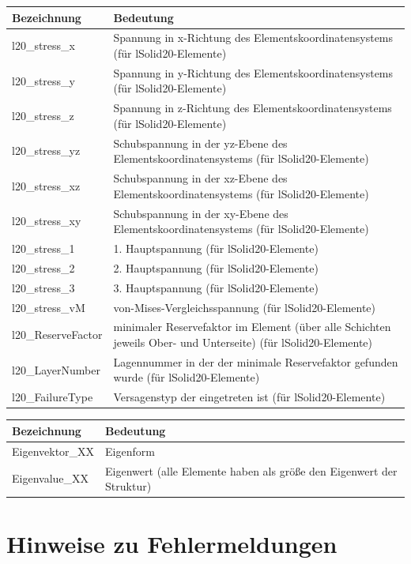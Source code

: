 \documentclass[11pt,titlepage,listof=totoc,bibliography=totoc,twoside]{scrreprt}
\begin{document}
{{\begin{tabularx}{\textwidth}{lX}
\toprule
Bezeichnung		& Bedeutung	\\
\midrule
l20\_stress\_x		& Spannung in x-Richtung des Elementskoordinatensystems (für lSolid20-Elemente) \\
l20\_stress\_y		& Spannung in y-Richtung des Elementskoordinatensystems (für lSolid20-Elemente) \\
l20\_stress\_z		& Spannung in z-Richtung des Elementskoordinatensystems (für lSolid20-Elemente) \\
l20\_stress\_yz		& Schubspannung in der yz-Ebene des Elementskoordinatensystems (für lSolid20-Elemente) \\
l20\_stress\_xz		& Schubspannung in der xz-Ebene des Elementskoordinatensystems (für lSolid20-Elemente) \\
l20\_stress\_xy		& Schubspannung in der xy-Ebene des Elementskoordinatensystems (für lSolid20-Elemente) \\
l20\_stress\_1		& 1. Hauptspannung (für lSolid20-Elemente) \\
l20\_stress\_2		& 2. Hauptspannung (für lSolid20-Elemente) \\
l20\_stress\_3		& 3. Hauptspannung (für lSolid20-Elemente) \\
l20\_stress\_vM		& von-Mises-Vergleichsspannung (für lSolid20-Elemente) \\
l20\_ReserveFactor	& minimaler Reservefaktor im Element (über alle Schichten jeweils Ober- und Unterseite) (für lSolid20-Elemente) \\
l20\_LayerNumber	& Lagennummer in der der minimale Reservefaktor gefunden wurde (für lSolid20-Elemente) \\
l20\_FailureType	& Versagenstyp der eingetreten ist (für lSolid20-Elemente) \\
\bottomrule
\end{tabularx}


\begin{tabularx}{\textwidth}{lX}
\toprule
Bezeichnung		& Bedeutung	\\
\midrule
Eigenvektor\_XX		& Eigenform \\
Eigenvalue\_XX		& Eigenwert (alle Elemente haben als größe den Eigenwert der Struktur) \\
\bottomrule
\end{tabularx}

\chapter{Hinweise zu Fehlermeldungen}

}}
\end{document}

